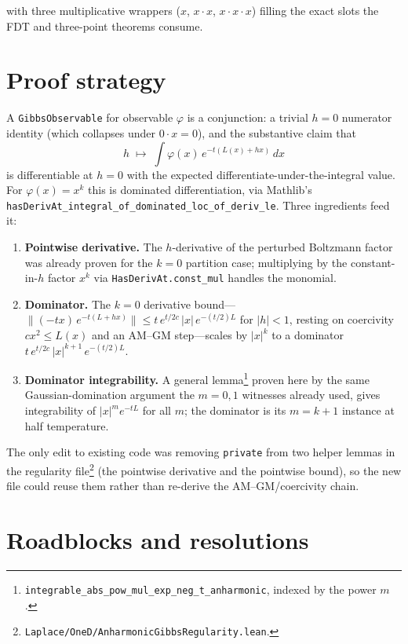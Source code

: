 \documentclass[11pt]{article}
\begin{document}
with three multiplicative wrappers ($x$, $x{\cdot}x$, $x{\cdot}x{\cdot}x$)
filling the exact slots the FDT and three-point theorems consume.

\section{Proof strategy}

A \texttt{GibbsObservable} for observable $\varphi$ is a conjunction: a
trivial $h{=}0$ numerator identity (which collapses under $0\cdot x =
0$), and the substantive claim that
\[
  h \;\longmapsto\; \int \varphi(x)\,e^{-t(L(x)+h x)}\,dx
\]
is differentiable at $h=0$ with the expected
differentiate-under-the-integral value. For $\varphi(x)=x^k$ this is
dominated differentiation, via Mathlib's
\texttt{hasDerivAt\_integral\_of\_dominated\_loc\_of\_deriv\_le}. Three
ingredients feed it:

\begin{enumerate}[itemsep=2pt]
\item \textbf{Pointwise derivative.} The $h$-derivative of the
  perturbed Boltzmann factor was already proven for the $k{=}0$ partition
  case; multiplying by the constant-in-$h$ factor $x^k$ via
  \texttt{HasDerivAt.const\_mul} handles the monomial.
\item \textbf{Dominator.} The $k{=}0$ derivative bound---$\|(-tx)\,
  e^{-t(L+hx)}\| \le t\,e^{t/2c}\,|x|\,e^{-(t/2)L}$ for $|h|<1$, resting on
  coercivity $c x^2 \le L(x)$ and an AM--GM step---scales by $|x|^k$ to a
  dominator $t\,e^{t/2c}\,|x|^{k+1}\,e^{-(t/2)L}$.
\item \textbf{Dominator integrability.} A general lemma\footnote{%
  \texttt{integrable\_abs\_pow\_mul\_exp\_neg\_t\_anharmonic}, indexed
  by the power $m$.}
  proven here by the same Gaussian-domination argument the $m{=}0,1$
  witnesses already used, gives integrability of $|x|^m e^{-tL}$ for all
  $m$; the dominator is its $m{=}k{+}1$ instance at half temperature.
\end{enumerate}

The only edit to existing code was removing \texttt{private} from two
helper lemmas in the regularity file\footnote{%
\texttt{Laplace/OneD/AnharmonicGibbsRegularity.lean}.}
(the pointwise derivative and the pointwise bound), so the new file
could reuse them rather than re-derive the AM--GM/coercivity chain.

\section{Roadblocks and resolutions}
\end{document}
